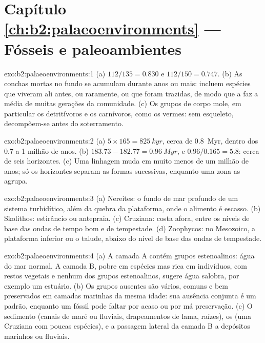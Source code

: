 \section*{Capítulo \ref{ch:b2:palaeoenvironments} --- Fósseis e paleoambientes}

\begin{solution}{exo:b2:palaeoenvironments:1}
(a) $112/135 = 0.830$ e $112/150 = 0.747$. (b) As conchas mortas no fundo se acumulam durante anos
ou mais: incluem espécies que viveram ali antes, ou raramente, ou que foram trazidas, de modo que a
 faz a média de muitas gerações da comunidade. (c) Os grupos de corpo mole, em
particular os detritívoros e os carnívoros, como os vermes: sem esqueleto, decompõem-se antes do soterramento.
\end{solution}

\begin{solution}{exo:b2:palaeoenvironments:2}
(a) $5 \times 165 = \qty{825}{kyr}$, cerca de \qty{0.8}{Myr}, dentro dos 0.7 a 1 milhão de anos.
(b) $183.73 - 182.77 = \qty{0.96}{Myr}$, e $0.96/0.165 = 5.8$: cerca de seis horizontes. (c) Uma
linhagem muda em muito menos de um milhão de anos; só os horizontes separam as formas
sucessivas, enquanto uma zona as agrupa.
\end{solution}

\begin{solution}{exo:b2:palaeoenvironments:3}
(a)  Nereites: o fundo de mar profundo de um sistema turbidítico, além da quebra da plataforma, onde
o alimento é escasso. (b)  Skolithos: estirâncio ou antepraia. (c)  Cruziana:
costa afora, entre os níveis de base das ondas de tempo bom e de tempestade. (d)  Zoophycos: no
Mesozoico, a plataforma inferior ou o talude, abaixo do nível de base das ondas de tempestade.
\end{solution}

\begin{solution}{exo:b2:palaeoenvironments:4}
(a) A camada A contém grupos estenoalinos: água do mar normal. A camada B, pobre em espécies mas rica em
indivíduos, com restos vegetais e nenhum dos grupos estenoalinos, sugere água salobra, por
exemplo um estuário. (b) Os grupos ausentes são vários, comuns e bem preservados em camadas marinhas
da mesma idade: sua ausência conjunta é um padrão, enquanto um fóssil pode faltar por acaso ou
por má preservação. (c) O sedimento (canais de maré ou fluviais, drapeamentos de lama, raízes), os
 (uma  Cruziana com poucas espécies), e a passagem lateral da camada B a
depósitos marinhos ou fluviais.
\end{solution}

